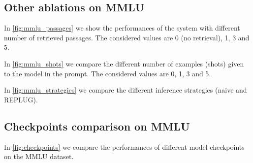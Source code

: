 \documentclass[11pt]{article}
\begin{document}
\subsection{Other ablations on MMLU}

In \ref{fig:mmlu_passages} we show the performances of the system with different 
number of retrieved passages. The considered values are 0 (no retrieval), 1, 3 and 5.

In \ref{fig:mmlu_shots} we compare the different number of examples (shots) given to
the model in the prompt. The considered values are 0, 1, 3 and 5.

In \ref{fig:mmlu_strategies} we compare the different inference strategies (naive and REPLUG).

\subsection{Checkpoints comparison on MMLU}

In \ref{fig:checkpoints} we compare the performances of different model checkpoints on the MMLU dataset.
\end{document}
